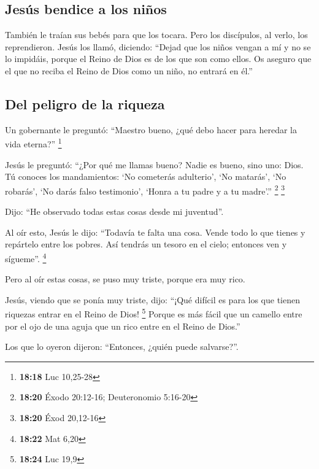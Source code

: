 \hypertarget{jesuxfas-bendice-a-los-niuxf1os}{%
\subsection{Jesús bendice a los
niños}\label{jesuxfas-bendice-a-los-niuxf1os}}

 También le traían sus bebés para que los tocara. Pero
los discípulos, al verlo, los reprendieron.  Jesús los
llamó, diciendo: ``Dejad que los niños vengan a mí y no se lo impidáis,
porque el Reino de Dios es de los que son como ellos.  Os
aseguro que el que no reciba el Reino de Dios como un niño, no entrará
en él.''

\hypertarget{del-peligro-de-la-riqueza}{%
\subsection{Del peligro de la riqueza}\label{del-peligro-de-la-riqueza}}

 Un gobernante le preguntó: ``Maestro bueno, ¿qué debo
hacer para heredar la vida eterna?'' \footnote{\textbf{18:18} Luc
  10,25-28}

 Jesús le preguntó: ``¿Por qué me llamas bueno? Nadie es
bueno, sino uno: Dios.  Tú conoces los mandamientos: `No
cometerás adulterio', `No matarás', `No robarás', `No darás falso
testimonio', `Honra a tu padre y a tu madre'.'' \footnote{\textbf{18:20}
  Éxodo 20:12-16; Deuteronomio 5:16-20} \footnote{\textbf{18:20} Éxod
  20,12-16}

 Dijo: ``He observado todas estas cosas desde mi
juventud''.

 Al oír esto, Jesús le dijo: ``Todavía te falta una cosa.
Vende todo lo que tienes y repártelo entre los pobres. Así tendrás un
tesoro en el cielo; entonces ven y sígueme''. \footnote{\textbf{18:22}
  Mat 6,20}

 Pero al oír estas cosas, se puso muy triste, porque era
muy rico.

 Jesús, viendo que se ponía muy triste, dijo: ``¡Qué
difícil es para los que tienen riquezas entrar en el Reino de Dios!
\footnote{\textbf{18:24} Luc 19,9}  Porque es más fácil
que un camello entre por el ojo de una aguja que un rico entre en el
Reino de Dios.''

 Los que lo oyeron dijeron: ``Entonces, ¿quién puede
salvarse?''.

